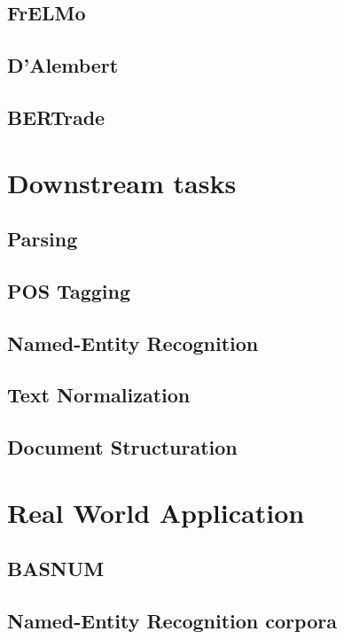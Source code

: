 \documentclass{mimosis}
\begin{document}
\chapter{FrELMo}
\chapter{D'Alembert}
\chapter{BERTrade}

\part{Downstream tasks}
\chapter{Parsing}
\chapter{POS Tagging}
\chapter{Named-Entity Recognition}
\chapter{Text Normalization}
\chapter{Document Structuration}

\part{Real World Application}
\chapter{BASNUM}
\chapter{Named-Entity Recognition corpora}


\backmatter

\begingroup
\let\clearpage\relax
\glsaddall
\printglossary[type=\acronymtype]
\newpage
\printglossary
\endgroup

\printindex



\end{document}
